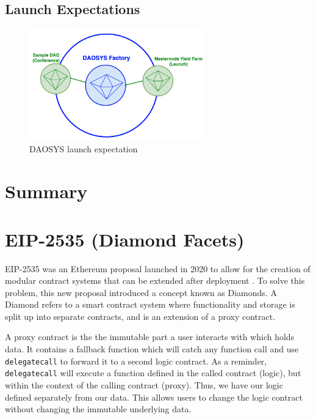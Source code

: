 \documentclass[journal,twocolumn,12pt]{ieeesyscoin}
\begin{document}
\subsection{Launch Expectations}

\lipsum[1]

\begin{figure}[h!]
\includegraphics[width=3in]{img/daosys_launch.png}
\caption{DAOSYS launch expectation} 
\label{fig:daosys_launch}
\end{figure} 

\section{Summary}
\label{section:summary}
\lipsum[1]

\appendices

\section{EIP-2535 (Diamond Facets)}
\label{sec:diamond}

EIP-2535 was an Ethereum proposal launched in 2020 to allow for the creation of modular contract systems that can be extended after deployment \cite{Mud20}. To solve this problem, this new proposal introduced a concept known as Diamonds. A Diamond refers to a smart contract system where functionality and storage is split up into separate contracts, and is an extension of a proxy contract.

A proxy contract is the the immutable part a user interacts with which holds data. It contains a fallback function which will catch any function call and use \texttt{delegatecall} to forward it to a second logic contract. As a reminder, \texttt{delegatecall} will execute a function defined in the called contract (logic), but within the context of the calling contract (proxy). Thus, we have our logic defined separately from our data. This allows users to change the logic contract without changing the immutable underlying data. 
\end{document}
